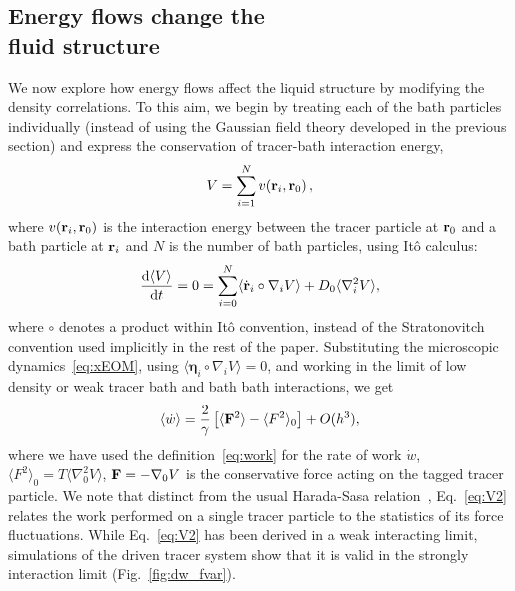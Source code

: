 \documentclass[pre, superscriptaddress, twocolumn,pre]{revtex4-1}
\newcommand{\dd}{\text{d}}
\begin{document}


\subsection{Energy flows change the\\fluid structure}

We now explore how energy flows affect the liquid structure by modifying the density correlations. To this aim, we begin by treating each of the bath particles individually (instead of using the Gaussian field theory developed in the previous section) and express the conservation of tracer-bath interaction energy, 
\begin{equation}
V=\sum_{i=1}^{N} v({\bf r}_i,{\bf r}_0)\,,
\label{eq:Vdef}
\end{equation}where $v({\bf r}_i,{\bf r}_0)$ is the interaction energy between the tracer particle at ${\bf r}_0$ and a bath particle at ${\bf r}_i$ and $N$ is the number of bath particles, using It\^o calculus:
\begin{equation}\label{eq:V1}
	\frac{\dd\langle V\rangle}{\dd t} = 0 =\sum_{i=0}^N \langle\dot{\bf r}_i\circ\nabla_iV\rangle + D_0 \langle\nabla_i^2V\rangle ,
\end{equation}
where $\circ$ denotes a product within It\^o convention, instead of the Stratonovitch convention used implicitly in the rest of the paper. Substituting the microscopic dynamics~\eqref{eq:xEOM}, using $\langle{\boldsymbol\eta_i}\circ\nabla_i V\rangle=0$, and working in the limit of low density or weak tracer bath and bath bath interactions, we get 
\begin{equation}\label{eq:V2}
	\langle \dot w\rangle = \frac{2}{\gamma} \left[ \langle{\bf F}^2 \rangle-\langle F^2\rangle_0\right] +O(h^3),
\end{equation}
where we have used the definition~\eqref{eq:work} for the rate of work $\dot w$, $\langle F^2\rangle_0 = T \langle\nabla^2_0 V\rangle$, ${\bf F}=-\nabla_0 V$ is the conservative force acting on the tagged tracer particle. We note that distinct from the usual Harada-Sasa relation~\cite{Harada2005,Harada2006}, Eq.~\ref{eq:V2} relates the work performed on a single tracer particle to the statistics of its force fluctuations. While Eq.~\ref{eq:V2} has been derived in a weak interacting limit, simulations of the driven tracer system show that it is valid in the strongly interaction limit (Fig.~\ref{fig:dw_fvar}). 
\end{document}

